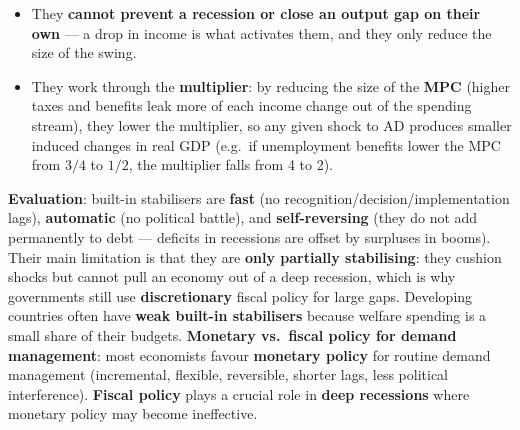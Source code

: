 \begin{itemize}
\begin{itemize}
    \item They \textbf{cannot prevent a recession or close an output gap on their own} --- a drop in income is what activates them, and they only reduce the size of the swing.
    \item They work through the \textbf{multiplier}: by reducing the size of the \textbf{MPC} (higher taxes and benefits leak more of each income change out of the spending stream), they lower the multiplier, so any given shock to AD produces smaller induced changes in real GDP (e.g.\ if unemployment benefits lower the MPC from $3/4$ to $1/2$, the multiplier falls from 4 to 2).
  \end{itemize}
\end{itemize}
\begin{center}
\end{center}
\textbf{Evaluation}: built-in stabilisers are \textbf{fast} (no recognition/decision/implementation lags), \textbf{automatic} (no political battle), and \textbf{self-reversing} (they do not add permanently to debt --- deficits in recessions are offset by surpluses in booms). Their main limitation is that they are \textbf{only partially stabilising}: they cushion shocks but cannot pull an economy out of a deep recession, which is why governments still use \textbf{discretionary} fiscal policy for large gaps. Developing countries often have \textbf{weak built-in stabilisers} because welfare spending is a small share of their budgets.
\textbf{Monetary vs.\ fiscal policy for demand management}: most economists favour \textbf{monetary policy} for routine demand management (incremental, flexible, reversible, shorter lags, less political interference). \textbf{Fiscal policy} plays a crucial role in \textbf{deep recessions} where monetary policy may become ineffective.
